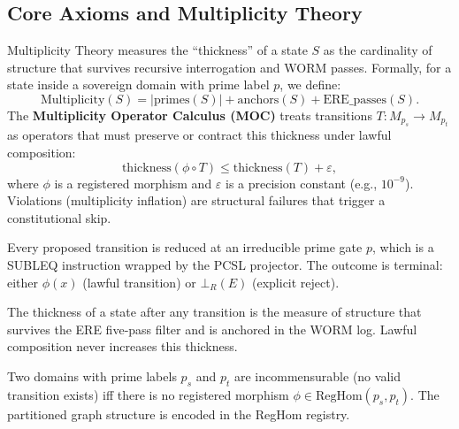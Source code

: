 \documentclass[11pt,a4paper]{article}
\theoremstyle{definition}
\theoremstyle{remark}
\begin{document}
\subsection{Core Axioms and Multiplicity Theory}
\label{subsec:axioms}
Multiplicity Theory measures the “thickness” of a state $S$ as the cardinality of structure that survives recursive interrogation and WORM passes. Formally, for a state inside a sovereign domain with prime label $p$, we define:
\begin{equation}
\text{Multiplicity}(S) = |\text{primes}(S)| + \text{anchors}(S) + \text{ERE\_passes}(S).
\end{equation}
The \textbf{Multiplicity Operator Calculus (MOC)} treats transitions $T: M_{p_s} \to M_{p_t}$ as operators that must preserve or contract this thickness under lawful composition:
\begin{equation}
\text{thickness}(\phi \circ T) \le \text{thickness}(T) + \varepsilon,
\end{equation}
where $\phi$ is a registered morphism and $\varepsilon$ is a precision constant (e.g., $10^{-9}$). Violations (multiplicity inflation) are structural failures that trigger a constitutional skip.

\begin{axiom}
Every proposed transition is reduced at an irreducible prime gate $p$, which is a SUBLEQ instruction wrapped by the PCSL projector. The outcome is terminal: either $\phi(x)$ (lawful transition) or $\bot_R(E)$ (explicit reject).
\end{axiom}

\begin{axiom}
The thickness of a state after any transition is the measure of structure that survives the ERE five‑pass filter and is anchored in the WORM log. Lawful composition never increases this thickness.
\end{axiom}

\begin{axiom}
Two domains with prime labels $p_s$ and $p_t$ are incommensurable (no valid transition exists) iff there is no registered morphism $\phi \in \text{RegHom}(p_s, p_t)$. The partitioned graph structure is encoded in the RegHom registry.
\end{axiom}
\end{document}

